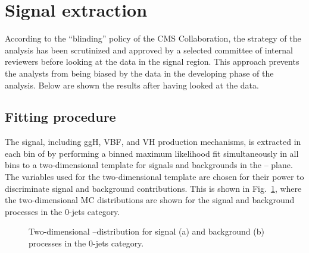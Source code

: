 \section{Signal extraction}
\label{sec:Signal extraction}

According to the ``blinding'' policy of the CMS Collaboration, the strategy of the analysis has been scrutinized and approved by a selected committee of internal reviewers before looking at the data in the signal region. This approach prevents the analysts from being biased by the data in the developing phase of the analysis. Below are shown the results after having looked at the data.


\subsection{Fitting procedure}\label{sec:fit}

The signal, including ggH, VBF, and VH production mechanisms, is extracted in each bin of \pth{} by performing a binned maximum likelihood fit simultaneously in all \pth{} bins to a two-dimensional template for signals and backgrounds in the \mll--\mt{} plane.
The variables used for the two-dimensional template are chosen for their power to discriminate signal and background contributions. This is shown in Fig.~\ref{fig:2Dlegacy}, where the two-dimensional MC distributions are shown for the signal and background processes in the 0-jets category. 

\begin{figure}[htb]
\centering
{}
\caption{Two-dimensional \mll--\mt distribution for signal (a) and background (b) processes in the 0-jets category.\label{fig:2Dlegacy}}
\end{figure}

